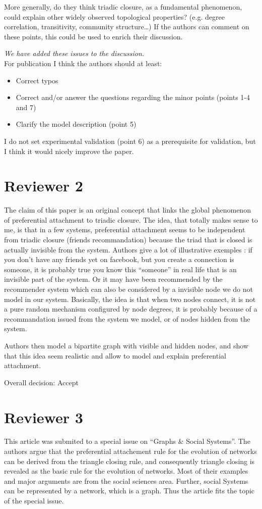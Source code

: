 \documentclass{article}
\begin{document}
More generally, do they think triadic closure, as a fundamental
phenomenon, could explain other widely observed topological properties?
(e.g. degree correlation, transitivity, community structure…) If the
authors can comment on these points, this could be used to enrich their
discussion. 

\textit{ We have added these issues to the discussion. } \\

For publication I think the authors should at least:
\begin{itemize}
\item Correct typos
\item Correct and/or answer the questions regarding the minor points (points 1-4 and 7)
\item Clarify the model description (point 5)
\end{itemize}
I do not set experimental validation (point 6) as a prerequisite for
validation, but I think it would nicely improve the paper. 

\section*{Reviewer 2}

The claim of this paper is an original concept that links the global
phenomenon of preferential attachment to triadic closure. The idea, that
totally makes sense to me, is that in a few systems, preferential
attachment seems to be independent from triadic closure (friends
recommandation) because the triad that is closed is actually invisible
from the system. Authors give a lot of illustrative exemples : if you
don't have any friends yet on facebook, but you create a connection is
someone, it is probably true you know this ``someone'' in real life that
is an invisible part of the system. Or it may have been recommended by
the recommender system which can also be considered by a invisible node
we do not model in our system. Basically, the idea is that when two
nodes connect, it is not a pure random mechanism configured by node
degrees, it is probably because of a recommandation issued from the
system we model, or of nodes hidden from the system.  

Authors then model a bipartite graph with visible and hidden nodes, and
show that this idea seem realistic and allow to model and explain
preferential attachment. 

Overall decision: Accept

\section*{Reviewer 3}
This article was submited to a special issue on ``Graphs \& Social
Systems''. 
The authors argue that the preferential attachement rule for the
evolution of networks can be derived from the triangle closing rule, and
consequently triangle closing is revealed as the basic rule for the
evolution of networks. 
Most of their examples and major arguments are from the social sciences
area. Further, social Systems can be represented by a network, which is
a graph. 
Thus the article fits the topic of the special issue.
 
\end{document}
